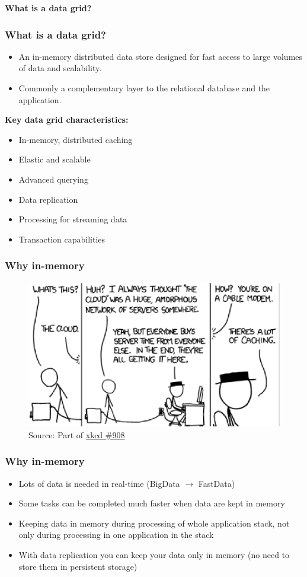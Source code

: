 \documentclass[10pt,utf8]{beamer}
\begin{document}
\begin{frame}
	\centering
	\huge{\textbf{What is a data grid?}}
\end{frame}

\begin{frame}
	\frametitle{What is a data grid?}
	\begin{itemize}
	 \item An in-memory distributed data store designed for fast access to large volumes of data and scalability.
	 \item Commonly a complementary layer to the relational database and the application.
	\end{itemize}
	\centering
	 {
	\color{blue}\textbf{Key data grid characteristics:}\color{black}
	\begin{itemize}
	 \item In-memory, distributed caching
	 \item Elastic and scalable
	 \item Advanced querying
	 \item Data replication
	 \item Processing for streaming data
	 \item Transaction capabilities
	\end{itemize}
	}
\end{frame}

\begin{frame}
	\frametitle{Why in-memory}
	\begin{figure}
		\centering
		\includegraphics[width=12cm]{./img/xkcd_908.eps}
		\caption{\tiny{Source: Part of \href{http://xkcd.com/908/}{xkcd \#908}}}
	\end{figure}
\end{frame}

\begin{frame}
	\frametitle{Why in-memory}
	\begin{itemize}
	 \item Lots of data is needed in real-time (BigData $\rightarrow$ FastData)
	 \pause
	 \item Some tasks can be completed much faster when data are kept in memory
	 \pause
	 \item Keeping data in memory during processing of whole application stack, not only during processing in one application in the stack
	 \pause
	 \item With data replication you can keep your data only in memory (no need to store them in persistent storage)
	\end{itemize}
\end{frame}
\end{document}
